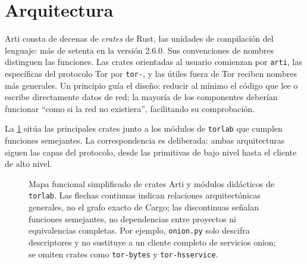 \section{Arquitectura}\label{sec:arti-architettura}

Arti consta de decenas de \emph{crates} de Rust, las unidades de compilación del lenguaje: más de setenta en la versión 2.6.0. Sus convenciones de nombres distinguen las funciones. Las crates orientadas al usuario comienzan por \texttt{arti}, las específicas del protocolo Tor por \texttt{tor-}, y las útiles fuera de Tor reciben nombres más generales. Un principio guía el diseño: reducir al mínimo el código que lee o escribe directamente datos de red; la mayoría de los componentes deberían funcionar \enquote{como si la red no existiera}, facilitando su comprobación.

La \cref{fig:crate} sitúa las principales crates junto a los módulos de \texttt{torlab} que cumplen funciones semejantes. La correspondencia es deliberada: ambas arquitecturas siguen las capas del protocolo, desde las primitivas de bajo nivel hasta el cliente de alto nivel.

\begin{figure}[htbp]
\centering

\caption{Mapa funcional simplificado de crates Arti y módulos didácticos de \texttt{torlab}. Las flechas continuas indican relaciones arquitectónicas generales, no el grafo exacto de Cargo; las discontinuas señalan funciones semejantes, no dependencias entre proyectos ni equivalencias completas. Por ejemplo, \texttt{onion.py} solo descifra descriptores y no sustituye a un cliente completo de servicios onion; se omiten crates como \texttt{tor-bytes} y \texttt{tor-hsservice}.}
\label{fig:crate}
\end{figure}

